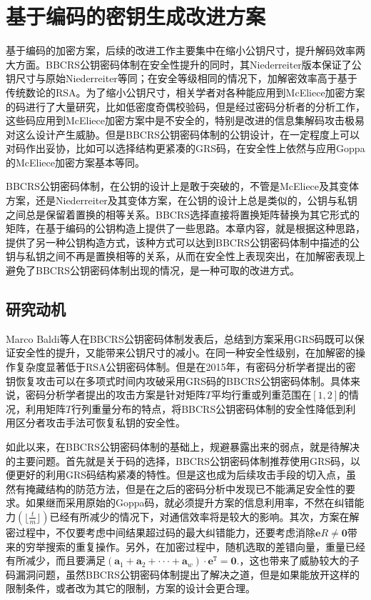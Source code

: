 \chapter{基于编码的密钥生成改进方案}
基于编码的加密方案，后续的改进工作主要集中在缩小公钥尺寸，提升解码效率两大方面。BBCRS公钥密码体制在安全性提升的同时，其Niederreiter版本保证了公钥尺寸与原始Niederreiter等同；在安全等级相同的情况下，加解密效率高于基于传统数论的RSA。为了缩小公钥尺寸，相关学者对各种能应用到McEliece加密方案的码进行了大量研究，比如低密度奇偶校验码，但是经过密码分析者的分析工作，这些码应用到McEliece加密方案中是不安全的，特别是改进的信息集解码攻击极易对这么设计产生威胁。但是BBCRS公钥密码体制的公钥设计，在一定程度上可以对码作出妥协，比如可以选择结构更紧凑的GRS码，在安全性上依然与应用Goppa的McEliece加密方案基本等同。

BBCRS公钥密码体制，在公钥的设计上是敢于突破的，不管是McEliece及其变体方案，还是Niederreiter及其变体方案，在公钥的设计上总是类似的，公钥与私钥之间总是保留着置换的相等关系。BBCRS选择直接将置换矩阵替换为其它形式的矩阵，在基于编码的公钥构造上提供了一些思路。本章内容，就是根据这种思路，提供了另一种公钥构造方式，该种方式可以达到BBCRS公钥密码体制中描述的公钥与私钥之间不再是置换相等的关系，从而在安全性上表现突出，在加解密表现上避免了BBCRS公钥密码体制出现的情况，是一种可取的改进方式。

\section{研究动机}
Marco Baldi等人在BBCRS公钥密码体制发表后，总结到方案采用GRS码既可以保证安全性的提升，又能带来公钥尺寸的减小。在同一种安全性级别，在加解密的操作复杂度显著低于RSA公钥密码体制。但是在2015年，有密码分析学者提出的密钥恢复攻击\cite{Couvreur2015A}可以在多项式时间内攻破采用GRS码的BBCRS公钥密码体制。具体来说，密码分析学者提出的攻击方案是针对矩阵$T$平均行重或列重范围在$[1,2]$的情况，利用矩阵$T$行列重量分布的特点，将BBCRS公钥密码体制的安全性降低到利用区分者攻击手法可恢复私钥的安全性。

如此以来，在BBCRS公钥密码体制的基础上，规避暴露出来的弱点，就是待解决的主要问题。首先就是关于码的选择，BBCRS公钥密码体制推荐使用GRS码，以便更好的利用GRS码结构紧凑的特性。但是这也成为后续攻击手段的切入点，虽然有掩藏结构的防范方法\cite{Berger2005How}，但是在之后的密码分析中发现已不能满足安全性的要求。如果继而采用原始的Goppa码，就必须提升方案的信息利用率，不然在纠错能力$(\lfloor \frac{t}{m} \rfloor)$已经有所减少的情况下，对通信效率将是较大的影响。其次，方案在解密过程中，不仅要考虑中间结果超过码的最大纠错能力，还要考虑消除$\mathbf{e}R \neq \mathbf{0}$带来的穷举搜索的重复操作。另外，在加密过程中，随机选取的差错向量，重量已经有所减少，而且要满足$(\mathbf{a}_1 + \mathbf{a}_2 + ··· + \mathbf{a}_w) \cdot \mathbf{e}^\mathtt{T} = \mathbf{0}.$，这也带来了威胁较大的子码漏洞问题，虽然BBCRS公钥密码体制提出了解决之道，但是如果能放开这样的限制条件，或者改为其它的限制，方案的设计会更合理。

